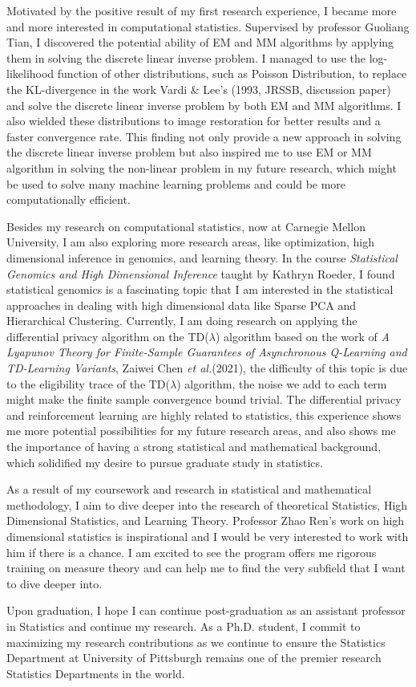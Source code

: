 \documentclass{article}
\begin{document}
Motivated by the positive result of my first research experience, I became more and more interested in computational statistics. Supervised by professor Guoliang Tian, I discovered the potential ability of EM and MM algorithms by applying them in solving the discrete linear inverse problem. I managed to use the log-likelihood function of other distributions, such as Poisson Distribution, to replace the KL-divergence in the work Vardi \& Lee’s (1993, JRSSB, discussion paper) and solve the discrete linear inverse problem by both EM and MM algorithms. I also wielded these distributions to image restoration for better results and a faster convergence rate. This finding not only provide a new approach in solving the discrete linear inverse problem but also inspired me to use EM or MM algorithm in solving the non-linear problem in my future research, which might be used to solve many machine learning problems and could be more computationally efficient.

Besides my research on computational statistics, now at Carnegie Mellon University, I am also exploring more research areas, like optimization, high dimensional inference in genomics, and learning theory. In the course \textit{Statistical Genomics and High Dimensional Inference} taught by Kathryn Roeder, I found statistical genomics is a fascinating topic that I am interested in the statistical approaches in dealing with high dimensional data like Sparse PCA and Hierarchical Clustering. Currently, I am doing research on applying the differential privacy algorithm on the TD($\lambda$) algorithm based on the work of \textit{A Lyapunov Theory for Finite-Sample Guarantees of Asynchronous Q-Learning and TD-Learning Variants}, Zaiwei Chen \textit{et al.}(2021), the difficulty of this topic is due to the eligibility trace of the TD($\lambda$) algorithm, the noise we add to each term might make the finite sample convergence bound trivial. The differential privacy and reinforcement learning are highly related to statistics, this experience shows me more potential possibilities for my future research areas, and also shows me the importance of having a strong statistical and mathematical background, which solidified my desire to pursue graduate study in statistics. 

As a result of my coursework and research in statistical and mathematical methodology, I aim to dive deeper into the research of theoretical Statistics, High Dimensional Statistics, and Learning Theory. Professor Zhao Ren’s work on high dimensional statistics is inspirational and I would be very interested to work with him if there is a chance. I am excited to see the program offers me rigorous training on measure theory and can help me to find the very subfield that I want to dive deeper into.

Upon graduation, I hope I can continue post-graduation as an assistant professor in Statistics and continue my research. As a Ph.D. student, I commit to maximizing my research contributions as we continue to ensure the Statistics Department at University of Pittsburgh remains one of the premier research Statistics Departments in the world.


 
\end{document}
